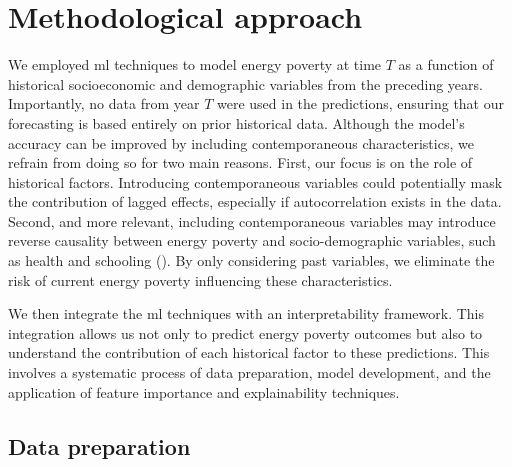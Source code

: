 \documentclass[preprint,authoryear,12pt]{elsarticle}
\newcommand{\citeTwo}[1]{(\cite{#1})}
\begin{document}
\section{Methodological approach} \label{Methodological_approach}

We employed \Gls{ml} techniques to model energy poverty at time $T$ as a function of historical socioeconomic and demographic variables from the preceding years. Importantly, no data from year $T$ were used in the predictions, ensuring that our forecasting is based entirely on prior historical data. Although the model's accuracy can be improved by including contemporaneous characteristics, we refrain from doing so for two main reasons. First, our focus is on the role of historical factors. Introducing contemporaneous variables could potentially mask the contribution of lagged effects, especially if autocorrelation exists in the data. Second, and more relevant, including contemporaneous variables may introduce reverse causality between energy poverty and socio-demographic variables, such as health and schooling \citeTwo {PK19,PEND24}. By only considering past variables, we eliminate the risk of current energy poverty influencing these characteristics.

We then integrate the \Gls{ml} techniques with an interpretability framework. This integration allows us not only to predict energy poverty outcomes but also to understand the contribution of each historical factor to these predictions. This involves a systematic process of data preparation, model development, and the application of feature importance and explainability techniques.

\subsection{Data preparation} \label{Data_preparation}
\end{document}
